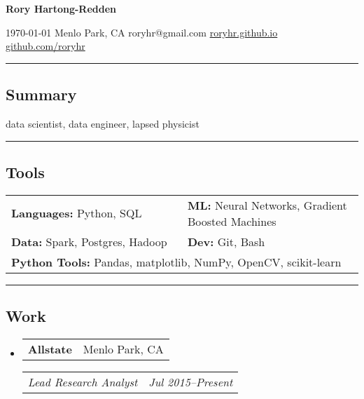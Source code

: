 \documentclass[10pt,letterpaper]{article}
\makeatletter
\newenvironment{indentsection}[1]%
{\begin{list}{}%
	{\setlength{\leftmargin}{#1}}%
	\item[]%
}
{\end{list}}
\newcommand{\headerrow}[2]
{\begin{tabular*}{\linewidth}{l@{\extracolsep{\fill}}r}
	#1 &
	#2 \\
\end{tabular*}}
\makeatother
\begin{document}
{\raggedright \LARGE \bf Rory Hartong-Redden\\}

{\raggedleft 
\today \/ \textbar
\/ Menlo Park, CA \textbar
\/ roryhr@gmail.com \textbar
\/ \href{roryhr.github.io}{roryhr.github.io} \textbar\/   
\href{https://github.com/roryhr}{github.com/roryhr}\\}
\hrule

\subsection*{Summary}
\begin{centering}  
data scientist, data engineer, lapsed physicist\\
\end{centering}

\hrule
\subsection*{Tools}
\begin{indentsection}{\parindent}
\begin{tabular}{p{0.5\linewidth}   p{0.5\linewidth} } 
	\textbf{Languages:}  Python, SQL
	& \textbf{ML:} Neural Networks, Gradient Boosted Machines \\

	\textbf{Data:} Spark, Postgres, Hadoop
	& \textbf{Dev:}  Git, Bash \\  
	
	\multicolumn{2}{l}{\textbf{Python Tools:} Pandas, matplotlib, NumPy, OpenCV, scikit-learn} \\
\end{tabular}
\end{indentsection}

\hrule
\subsection*{Work}
\begin{itemize}
	\parskip=-0.1em
	\item
	\headerrow
	{\textbf{Allstate}}
	{Menlo Park, CA}
	\headerrow
	{\emph{Lead Research Analyst}}
	{\emph{Jul 2015--Present}}
\end{itemize}
\end{document}
